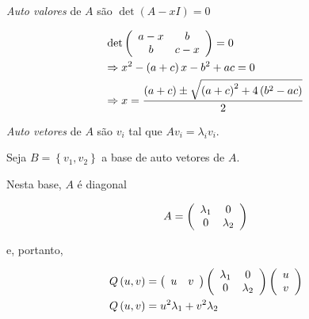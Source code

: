 \documentclass{book}
\begin{document}
\textit{Auto valores} de $A$ s\~ao $\det \left( {A - xI} \right) = 0$

\[
\begin{gathered}
\det \left( {\begin{array}{*{20}c}
{a - x} & b  \\
b & {c - x}  \\

\end{array} } \right) = 0 \hfill \\
\Rightarrow x^2  - \left( {a + c} \right)x - b^2  + ac = 0 \hfill \\
   \Rightarrow x = \frac{{\left( {a + c} \right) \pm \sqrt {\left( {a + c} \right)^2  + 4\left( {b^2  - ac} \right)} }}
{2} \hfill \\
\end{gathered}
\]

\textit{Auto vetores} de $A$ s\~ao $v_i$ tal que $Av_i  = \lambda _i v_i$.

Seja $B = \left\{ {v_1 ,v_2 } \right\}$ a base de auto vetores de $A$.

Nesta base, $A$ \'e diagonal

\[
A = \left( {\begin{array}{*{20}c}
{\lambda _1 } & 0  \\
0 & {\lambda _2 }  \\

\end{array} } \right)
\]

e, portanto,

\[
\begin{gathered}
Q\left( {u,v} \right) = \left( {\begin{array}{*{20}c}
u & v  \\

\end{array} } \right)\left( {\begin{array}{*{20}c}
{\lambda _1 } & 0  \\
0 & {\lambda _2 }  \\

\end{array} } \right)\left( {\begin{array}{*{20}c}
u  \\
v  \\

\end{array} } \right) \hfill \\
Q\left( {u,v} \right) = u^2 \lambda _1  + v^2 \lambda _2  \hfill \\
\end{gathered}
\]
\end{document}
